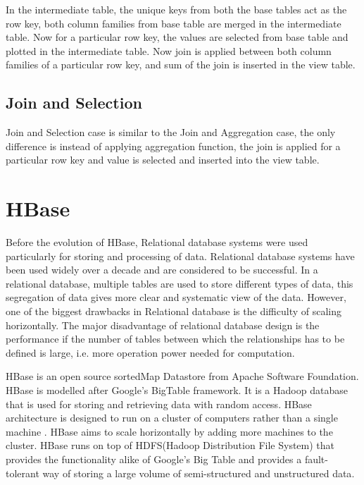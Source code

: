 \documentclass[11pt,a4paper,bibtotoc,idxtotoc,headsepline,footsepline,footexclude,BCOR12mm,DIV13]{scrbook}
\begin{document}
In the intermediate table, the unique keys from both the base tables act as the row key, both column families from base table are merged in the intermediate table. Now for a particular row key, the values are selected from base table and plotted in the intermediate table. Now join is applied between both column families of a particular row key, and sum of the join is inserted in the view table.  


\subsection{Join and Selection}
Join and Selection case is similar to the Join and Aggregation case, the only difference is instead of applying aggregation function, the join is applied for a particular row key and value is selected and inserted into the view table.

\newpage
\section{HBase}
\label{sec:hbase}

Before the evolution of HBase, Relational database systems were used particularly for storing and processing of data. Relational database systems have been used widely over a decade and are considered to be successful. In a relational database, multiple tables are used to store different types of data, this segregation of data gives more clear and systematic view of the data\cite{relational:dbs}. However, one of the biggest drawbacks in Relational database is the difficulty of scaling horizontally. The major disadvantage of relational database design is the performance if the number of tables between which the relationships has to be defined is large, i.e. more operation power needed for computation\cite{relational:dbs}. 

HBase is an open source sortedMap Datastore from Apache Software Foundation. HBase is modelled after Google's BigTable framework. It is a Hadoop database that is used for storing and retrieving data with random access. HBase architecture is designed to run on a cluster of computers rather than a single machine \cite{coprocessor:detail}. HBase aims to scale horizontally by adding more machines to the cluster. HBase runs on top of HDFS(Hadoop Distribution File System) that provides the functionality alike of Google's Big Table and provides a fault-tolerant way of storing a large volume of semi-structured and unstructured data\cite{bigdata:analysis}.
\end{document}

